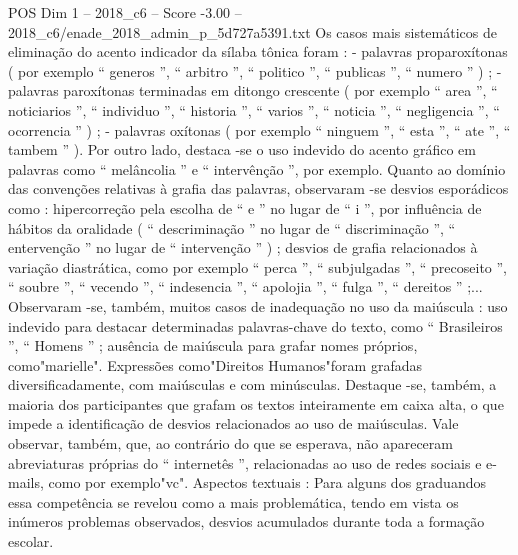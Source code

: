 \begin{textsample}{POS Dim 1 – 2018\_c6 – Score -3.00 – 2018\_c6/enade\_2018\_admin\_p\_5d727a5391.txt}
Os casos mais sistemáticos de eliminação do acento indicador da sílaba tônica foram : - palavras proparoxítonas ( por exemplo “ generos ”, “ arbitro ”, “ politico ”, “ publicas ”, “ numero ” ) ; - palavras paroxítonas terminadas em ditongo crescente ( por exemplo “ area ”, “ noticiarios ”, “ individuo ”, “ historia ”, “ varios ”, “ noticia ”, “ negligencia ”, “ ocorrencia ” ) ; - palavras oxítonas ( por exemplo “ ninguem ”, “ esta ”, “ ate ”, “ tambem ” ).
Por outro lado, destaca -se o uso indevido do acento gráfico em palavras como “ melâncolia ” e “ intervênção ”, por exemplo.
Quanto ao domínio das convenções relativas à grafia das palavras, observaram -se desvios esporádicos como : hipercorreção pela escolha de “ e ” no lugar de “ i ”, por influência de hábitos da oralidade ( “ descriminação ” no lugar de “ discriminação ”, “ entervenção ” no lugar de “ intervenção ” ) ; desvios de grafia relacionados à variação diastrática, como por exemplo “ perca ”, “ subjulgadas ”, “ precoseito ”, “ soubre ”, “ vecendo ”, “ indesencia ”, “ apolojia ”, “ fulga ”, “ dereitos ” ;...
Observaram -se, também, muitos casos de inadequação no uso da maiúscula : uso indevido para destacar determinadas palavras-chave do texto, como “ Brasileiros ”, “ Homens ” ; ausência de maiúscula para grafar nomes próprios, como"marielle".
Expressões como"Direitos Humanos"foram grafadas diversificadamente, com maiúsculas e com minúsculas.
Destaque -se, também, a maioria dos participantes que grafam os textos inteiramente em caixa alta, o que impede a identificação de desvios relacionados ao uso de maiúsculas.
Vale observar, também, que, ao contrário do que se esperava, não apareceram abreviaturas próprias do “ internetês ”, relacionadas ao uso de redes sociais e e-mails, como por exemplo"vc".
Aspectos textuais : Para alguns dos graduandos essa competência se revelou como a mais problemática, tendo em vista os inúmeros problemas observados, desvios acumulados durante toda a formação escolar.

\end{textsample}
